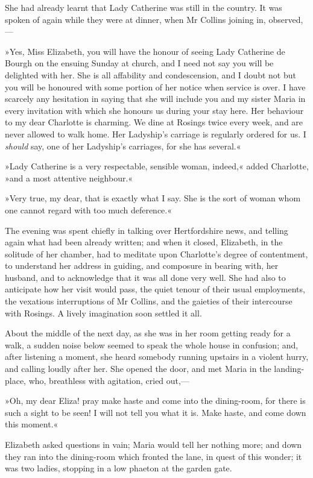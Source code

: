 She had already learnt that Lady Catherine was still in the country. It was spoken of again while they were at dinner, when Mr Collins joining in, observed,—

»Yes, Miss Elizabeth, you will have the honour of seeing Lady Catherine de Bourgh on the ensuing Sunday at church, and I need not say you will be delighted with her. She is all affability and condescension, and I doubt not but you will be honoured with some portion of her notice when service is over. I have scarcely any hesitation in saying that she will include you and my sister Maria in every invitation with which she honours us during your stay here. Her behaviour to my dear Charlotte is charming. We dine at Rosings twice every week, and are never allowed to walk home. Her Ladyship's carriage is regularly ordered for us. I \textit{should} say, one of her Ladyship's carriages, for she has several.«

»Lady Catherine is a very respectable, sensible woman, indeed,« added Charlotte, »and a most attentive neighbour.«

»Very true, my dear, that is exactly what I say. She is the sort of woman whom one cannot regard with too much deference.«

The evening was spent chiefly in talking over Hertfordshire news, and telling again what had been already written; and when it closed, Elizabeth, in the solitude of her chamber, had to meditate upon Charlotte's degree of contentment, to understand her address in guiding, and composure in bearing with, her husband, and to acknowledge that it was all done very well. She had also to anticipate how her visit would pass, the quiet tenour of their usual employments, the vexatious interruptions of Mr Collins, and the gaieties of their intercourse with Rosings. A lively imagination soon settled it all.

About the middle of the next day, as she was in her room getting ready for a walk, a sudden noise below seemed to speak the whole house in confusion; and, after listening a moment, she heard somebody running upstairs in a violent hurry, and calling loudly after her. She opened the door, and met Maria in the landing-place, who, breathless with agitation, cried out,—

»Oh, my dear Eliza! pray make haste and come into the dining-room, for there is such a sight to be seen! I will not tell you what it is. Make haste, and come down this moment.«

Elizabeth asked questions in vain; Maria would tell her nothing more; and down they ran into the dining-room which fronted the lane, in quest of this wonder; it was two ladies, stopping in a low phaeton at the garden gate.

